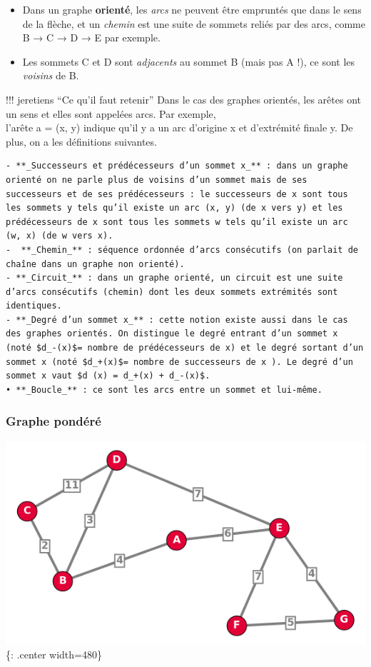\documentclass[
  letterpaper,
  DIV=11,
  numbers=noendperiod]{scrartcl}
\begin{document}
\begin{itemize}
\item
  Dans un graphe \textbf{orienté}, les \emph{arcs} ne peuvent être
  empruntés que dans le sens de la flèche, et un \emph{chemin} est une
  suite de sommets reliés par des arcs, comme B → C → D → E par exemple.
\item
  Les sommets C et D sont \emph{adjacents} au sommet B (mais pas A !),
  ce sont les \emph{voisins} de B.
\end{itemize}

!!! jeretiens ``Ce qu'il faut retenir'' Dans le cas des graphes
orientés, les arêtes ont un sens et elles sont appelées arcs. Par
exemple,\\
l'arête a = (x, y) indique qu'il y a un arc d'origine x et d'extrémité
finale y. De plus, on a les définitions suivantes.

\begin{verbatim}
- **_Successeurs et prédécesseurs d’un sommet x_** : dans un graphe orienté on ne parle plus de voisins d’un sommet mais de ses successeurs et de ses prédécesseurs : le successeurs de x sont tous les sommets y tels qu’il existe un arc (x, y) (de x vers y) et les prédécesseurs de x sont tous les sommets w tels qu’il existe un arc (w, x) (de w vers x).  
-  **_Chemin_** : séquence ordonnée d’arcs consécutifs (on parlait de chaîne dans un graphe non orienté).  
- **_Circuit_** : dans un graphe orienté, un circuit est une suite d’arcs consécutifs (chemin) dont les deux sommets extrémités sont identiques.  
- **_Degré d’un sommet x_** : cette notion existe aussi dans le cas des graphes orientés. On distingue le degré entrant d’un sommet x (noté $d_-(x)$= nombre de prédécesseurs de x) et le degré sortant d’un sommet x (noté $d_+(x)$= nombre de successeurs de x ). Le degré d’un sommet x vaut $d (x) = d_+(x) + d_-(x)$.  
• **_Boucle_** : ce sont les arcs entre un sommet et lui-même.
\end{verbatim}

\hypertarget{graphe-ponduxe9ruxe9}{%
\subsubsection{Graphe pondéré}\label{graphe-ponduxe9ruxe9}}

\includegraphics{data/exemple_graphe_pondere.png}\{: .center width=480\}
\end{document}

